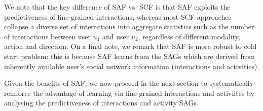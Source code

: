 




We note that the key difference of SAF vs. SCF is
that SAF exploits the predictiveness of fine-grained interactions, whereas most SCF
approaches~\cite{Noel2012NOF,lla,socinf,sr,rrmf,ste} collapse a diverse set
 of interactions into aggregate statistics such as the number of interactions 
between user $u_1$ and user $u_2$, regardless of different modality, action and direction.
On a final note, we remark that SAF is more robust to cold start 
problem: this is because SAF learns from the SAGs which are derived from 
inherently available user's social network information (interactions and activities).


Given the benefits of SAF, we now proceed in the
next section to systematically reinforce the advantage of learning via fine-grained 
interactions and activiites by analysing the predictiveness of interactions and activity SAGs.

